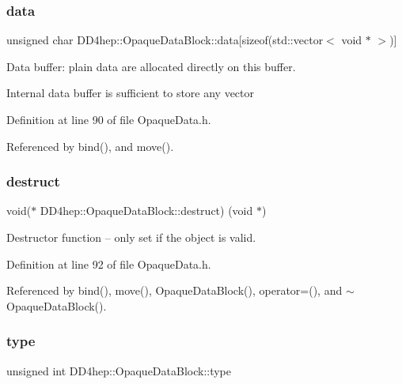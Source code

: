 \subsubsection{\texorpdfstring{data}{data}}
{\footnotesize\ttfamily unsigned char D\+D4hep\+::\+Opaque\+Data\+Block\+::data\mbox{[}sizeof(std\+::vector$<$ void $\ast$ $>$)\mbox{]}\hspace{0.3cm}{\ttfamily [private]}}



Data buffer\+: plain data are allocated directly on this buffer. 

Internal data buffer is sufficient to store any vector 

Definition at line 90 of file Opaque\+Data.\+h.



Referenced by bind(), and move().

\hypertarget{class_d_d4hep_1_1_opaque_data_block_a7480cd5ca3b040da44a7a902a2cf3bfd}{}\label{class_d_d4hep_1_1_opaque_data_block_a7480cd5ca3b040da44a7a902a2cf3bfd} 
\subsubsection{\texorpdfstring{destruct}{destruct}}
{\footnotesize\ttfamily void($\ast$ D\+D4hep\+::\+Opaque\+Data\+Block\+::destruct) (void $\ast$)\hspace{0.3cm}{\ttfamily [private]}}



Destructor function -- only set if the object is valid. 



Definition at line 92 of file Opaque\+Data.\+h.



Referenced by bind(), move(), Opaque\+Data\+Block(), operator=(), and $\sim$\+Opaque\+Data\+Block().

\hypertarget{class_d_d4hep_1_1_opaque_data_block_a6e7306f78bcdfcf15f53fdc6a2f34457}{}\label{class_d_d4hep_1_1_opaque_data_block_a6e7306f78bcdfcf15f53fdc6a2f34457} 
\subsubsection{\texorpdfstring{type}{type}}
{\footnotesize\ttfamily unsigned int D\+D4hep\+::\+Opaque\+Data\+Block\+::type}



